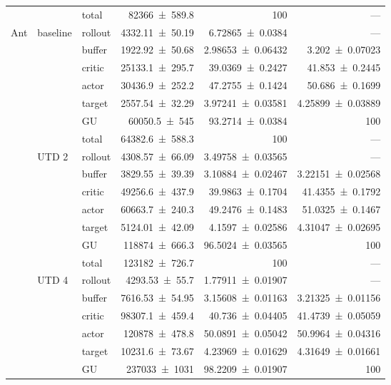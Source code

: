 {\begin{longtable}{@{}lllrrr@{}}
     &  & total & \num{82366+-589.8} & \num{100} & --- \\
    \addlinespace[2pt]
    \midrule
    Ant & baseline & rollout & \num{4332.11+-50.19} & \num{6.72865+-0.0384} & --- \\
     &  & buffer & \num{1922.92+-50.68} & \num{2.98653+-0.06432} & \num{3.202+-0.07023} \\
     &  & critic & \num{25133.1+-295.7} & \num{39.0369+-0.2427} & \num{41.853+-0.2445} \\
     &  & actor & \num{30436.9+-252.2} & \num{47.2755+-0.1424} & \num{50.686+-0.1699} \\
     &  & target & \num{2557.54+-32.29} & \num{3.97241+-0.03581} & \num{4.25899+-0.03889} \\
     &  & GU & \num{60050.5+-545} & \num{93.2714+-0.0384} & 100 \\
     &  & total & \num{64382.6+-588.3} & \num{100} & --- \\
    \addlinespace[2pt]
     & UTD 2 & rollout & \num{4308.57+-66.09} & \num{3.49758+-0.03565} & --- \\
     &  & buffer & \num{3829.55+-39.39} & \num{3.10884+-0.02467} & \num{3.22151+-0.02568} \\
     &  & critic & \num{49256.6+-437.9} & \num{39.9863+-0.1704} & \num{41.4355+-0.1792} \\
     &  & actor & \num{60663.7+-240.3} & \num{49.2476+-0.1483} & \num{51.0325+-0.1467} \\
     &  & target & \num{5124.01+-42.09} & \num{4.1597+-0.02586} & \num{4.31047+-0.02695} \\
     &  & GU & \num{118874+-666.3} & \num{96.5024+-0.03565} & 100 \\
     &  & total & \num{123182+-726.7} & \num{100} & --- \\
    \addlinespace[2pt]
     & UTD 4 & rollout & \num{4293.53+-55.7} & \num{1.77911+-0.01907} & --- \\
     &  & buffer & \num{7616.53+-54.95} & \num{3.15608+-0.01163} & \num{3.21325+-0.01156} \\
     &  & critic & \num{98307.1+-459.4} & \num{40.736+-0.04405} & \num{41.4739+-0.05059} \\
     &  & actor & \num{120878+-478.8} & \num{50.0891+-0.05042} & \num{50.9964+-0.04316} \\
     &  & target & \num{10231.6+-73.67} & \num{4.23969+-0.01629} & \num{4.31649+-0.01661} \\
     &  & GU & \num{237033+-1031} & \num{98.2209+-0.01907} & 100 \\

\end{longtable}}
